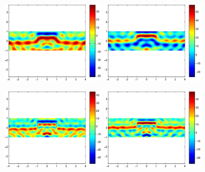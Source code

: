 \documentclass[12pt]{iopart}
\begin{document}
\begin{figure}
	\centering
	\includegraphics[width=0.45\textwidth]{./figure_rough/square_1point5}
	\includegraphics[width=0.45\textwidth]{./figure_rough/square_1point5_real}
	\caption{}\label{I1}
\end{figure}
\begin{figure}
	\centering
	\includegraphics[width=0.45\textwidth]{./figure_rough/square_2}
	\includegraphics[width=0.45\textwidth]{./figure_rough/square_2_real}
	\caption{}\label{I1}
\end{figure}
\end{document}
